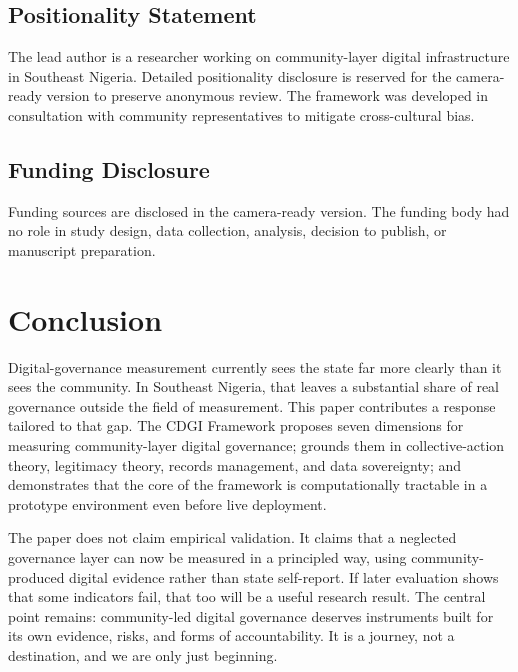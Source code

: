 \documentclass[sigconf,anonymous]{acmart}
\begin{document}
\subsection{Positionality Statement}

The lead author is a researcher working on community-layer digital infrastructure in Southeast Nigeria. Detailed positionality disclosure is reserved for the camera-ready version to preserve anonymous review. The framework was developed in consultation with community representatives to mitigate cross-cultural bias.

\subsection{Funding Disclosure}

Funding sources are disclosed in the camera-ready version. The funding body had no role in study design, data collection, analysis, decision to publish, or manuscript preparation.

\section{Conclusion}

Digital-governance measurement currently sees the state far more clearly than it sees the community. In Southeast Nigeria, that leaves a substantial share of real governance outside the field of measurement. This paper contributes a response tailored to that gap. The CDGI Framework proposes seven dimensions for measuring community-layer digital governance; grounds them in collective-action theory, legitimacy theory, records management, and data sovereignty; and demonstrates that the core of the framework is computationally tractable in a prototype environment even before live deployment.

The paper does not claim empirical validation. It claims that a neglected governance layer can now be measured in a principled way, using community-produced digital evidence rather than state self-report. If later evaluation shows that some indicators fail, that too will be a useful research result. The central point remains: community-led digital governance deserves instruments built for its own evidence, risks, and forms of accountability. It is a journey, not a destination, and we are only just beginning.
\end{document}
